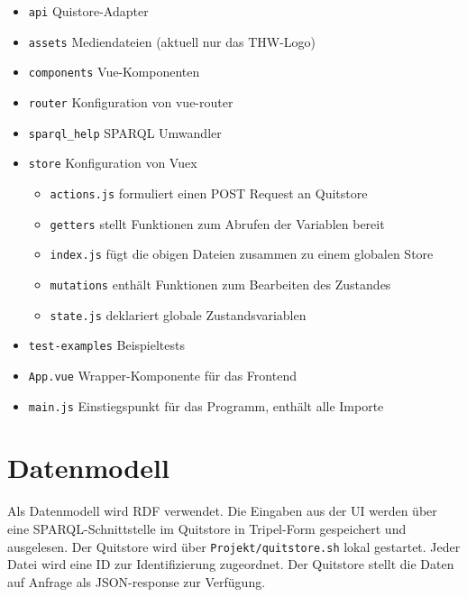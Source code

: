 \documentclass[a4paper,11pt,oneside, titlepage]{article}
\begin{document}
  \newpage


    \begin{itemize}
      \item \verb+api+ Quistore-Adapter
      \item \verb+assets+ Mediendateien (aktuell nur das THW-Logo)
      \item \verb+components+ Vue-Komponenten
      \item \verb+router+ Konfiguration von vue-router
      \item \verb+sparql_help+ SPARQL Umwandler
      \item \verb+store+ Konfiguration von Vuex
        \begin{itemize}
          \item \verb+actions.js+ formuliert einen POST Request an Quitstore
          \item \verb+getters+ stellt Funktionen zum Abrufen der Variablen bereit
          \item \verb+index.js+ fügt die obigen Dateien zusammen zu einem globalen Store
          \item \verb+mutations+ enthält Funktionen zum Bearbeiten des Zustandes
          \item \verb+state.js+ deklariert globale Zustandsvariablen
        \end{itemize}
      \item \verb+test-examples+ Beispieltests
      \item \verb+App.vue+ Wrapper-Komponente für das Frontend
      \item \verb+main.js+ Einstiegspunkt für das Programm, enthält alle Importe
    \end{itemize}

\begin{minipage}{16cm}
\end{minipage}



\section{Datenmodell}
Als Datenmodell wird \gls{RDF} verwendet. Die Eingaben aus der UI werden über eine \gls{SPARQL}-Schnittstelle im \gls{Quitstore} in Tripel-Form gespeichert und ausgelesen. Der Quitstore wird über \verb+Projekt/quitstore.sh+ lokal gestartet. Jeder Datei wird eine ID zur Identifizierung zugeordnet. Der Quitstore stellt die Daten auf Anfrage als \gls{JSON}-response zur Verfügung.

  \newpage

  \printglossaries
\end{document}
